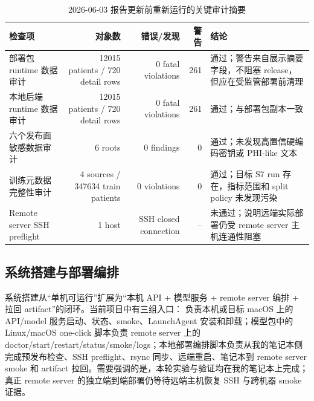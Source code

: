 \documentclass[11pt,a4paper]{article}
\newcommand{\reporttablesize}{\small}
\begin{document}
\begin{table}[H]
\centering
\caption{2026-06-03 报告更新前重新运行的关键审计摘要}
\label{tab:fresh-audit-summary}
\reporttablesize
\setlength{\tabcolsep}{5pt}
\renewcommand{\arraystretch}{1.12}
\begin{tabularx}{\textwidth}{@{}l r r r Y@{}}
\toprule
检查项 & 对象数 & 错误/发现 & 警告 & 结论\\
\midrule
部署包 runtime 数据审计 & 12015 patients / 720 detail rows & 0 fatal violations & 261 & 通过；警告来自展示摘要字段，不阻塞 release，但应在受监管部署前清理\\
本地后端 runtime 数据审计 & 12015 patients / 720 detail rows & 0 fatal violations & 261 & 通过；与部署包副本一致\\
六个发布面敏感数据审计 & 6 roots & 0 findings & 0 & 通过；未发现高置信硬编码密钥或 PHI-like 文本\\
训练元数据完整性审计 & 4 sources / 347634 train patients & 0 violations & 0 & 通过；目标 S7 run 存在，指标范围和 split policy 未发现污染\\
Remote server SSH preflight & 1 host & SSH closed connection & -- & 未通过；说明远端实际部署仍受 remote server 主机连通性阻塞\\
\bottomrule
\end{tabularx}
\end{table}

\subsection{系统搭建与部署编排}
系统搭建从“单机可运行”扩展为“本机 API + 模型服务 + remote server 编排 + 拉回 artifact”的闭环。当前项目中有三组入口： 负责本机或目标 macOS 上的 API/model 服务启动、状态、smoke、LaunchAgent 安装和卸载；模型包中的 Linux/macOS one-click 脚本负责 remote server 上的 doctor/start/restart/status/smoke/logs；本地部署编排脚本负责从我的笔记本侧完成预发布检查、SSH preflight、rsync 同步、远端重启、笔记本到 remote server smoke 和 artifact 拉回。需要强调的是，本轮实验与验证均在我的笔记本上完成；真正 remote server 的独立端到端部署仍等待远端主机恢复 SSH 与跨机器 smoke 证据。
\end{document}
